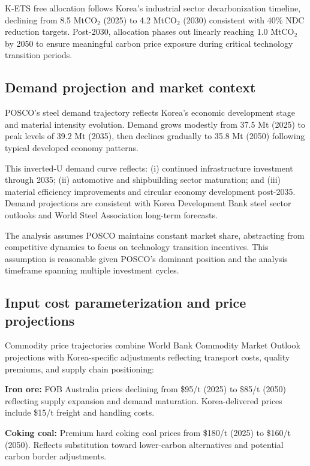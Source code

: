 \documentclass[preprint,1p,authoryear]{elsarticle}
\begin{document}
K-ETS free allocation follows Korea's industrial sector decarbonization timeline, declining from 8.5 MtCO$_2$ (2025) to 4.2 MtCO$_2$ (2030) consistent with 40\% NDC reduction targets. Post-2030, allocation phases out linearly reaching 1.0 MtCO$_2$ by 2050 to ensure meaningful carbon price exposure during critical technology transition periods.

\subsection{Demand projection and market context}

POSCO's steel demand trajectory reflects Korea's economic development stage and material intensity evolution. Demand grows modestly from 37.5 Mt (2025) to peak levels of 39.2 Mt (2035), then declines gradually to 35.8 Mt (2050) following typical developed economy patterns.

This inverted-U demand curve reflects: (i) continued infrastructure investment through 2035; (ii) automotive and shipbuilding sector maturation; and (iii) material efficiency improvements and circular economy development post-2035. Demand projections are consistent with Korea Development Bank steel sector outlooks and World Steel Association long-term forecasts.

The analysis assumes POSCO maintains constant market share, abstracting from competitive dynamics to focus on technology transition incentives. This assumption is reasonable given POSCO's dominant position and the analysis timeframe spanning multiple investment cycles.

\subsection{Input cost parameterization and price projections}

Commodity price trajectories combine World Bank Commodity Market Outlook projections with Korea-specific adjustments reflecting transport costs, quality premiums, and supply chain positioning:

\textbf{Iron ore:} FOB Australia prices declining from \$95/t (2025) to \$85/t (2050) reflecting supply expansion and demand maturation. Korea-delivered prices include \$15/t freight and handling costs.

\textbf{Coking coal:} Premium hard coking coal prices from \$180/t (2025) to \$160/t (2050). Reflects substitution toward lower-carbon alternatives and potential carbon border adjustments.
\end{document}
